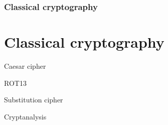 \section[Section]{Classical cryptography}
\part{Classical cryptography}

\begin{frame}{Caesar cipher}

\end{frame}

\begin{frame}{ROT13}

\end{frame}

\begin{frame}{Substitution cipher}

\end{frame}

\begin{frame}{Cryptanalysis}

  
\end{frame}
